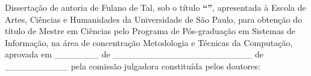 \documentclass[
	12pt,				%
	oneside,			%
	a4paper,			%
	english,			%
	brazil				%
	]{abntex2ppgsi}
\begin{document}

\begin{folhadeaprovacao}
%
%
%
%
\noindent Dissertação de autoria de Fulano de Tal, sob o título \textbf{``\imprimirtitulo''}, apresentada à Escola de Artes, Ciências e Humanidades da Universidade de São Paulo, para obtenção do título de Mestre em Ciências pelo Programa de Pós-graduação em Sistemas de Informação, na área de concentração Metodologia e Técnicas da Computação, aprovada em \_\_\_\_\_\_\_ de \_\_\_\_\_\_\_\_\_\_\_\_\_\_\_\_\_\_\_\_\_\_ de \_\_\_\_\_\_\_\_\_\_ pela comissão julgadora constituída pelos doutores:

\vspace*{3cm}


\end{folhadeaprovacao}
\end{document}
